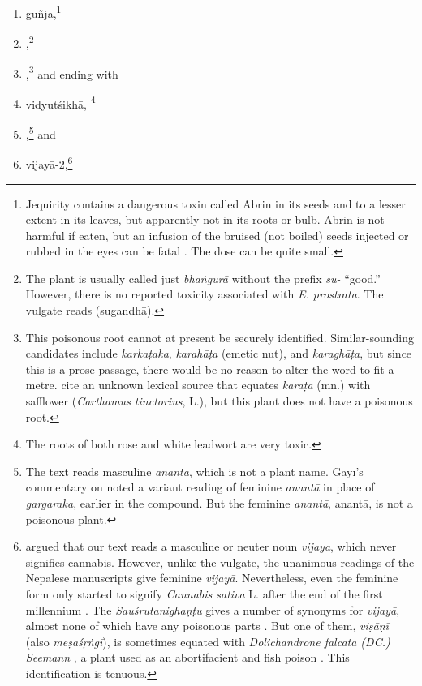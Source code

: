 \begin{translation}
\begin{itemize}
\begin{enumerate}
        \item \gls{guñjā},\footnote{Jequirity contains a dangerous
    toxin called Abrin in its seeds and to a lesser extent in its
    leaves, but apparently not in its roots or bulb. Abrin is not
    harmful if eaten, but an infusion of the bruised (not boiled)
    seeds injected or rubbed in the eyes can be fatal \citep[\#
    6]{NK}.  The dose can be quite small.}
        
        \item {},\footnote{The plant is usually
    called just \emph{bhaṅgurā} without the prefix \emph{su-}
    “good.”  However, there is no reported toxicity associated
    with \emph{E. prostrata}.  The vulgate reads 
    (\gls{sugandhā}).}
        
       \item {},\footnote{This poisonous root cannot
    at present be securely identified.  Similar-sounding
    candidates include \emph{karkaṭaka}, \emph{karahāṭa} (emetic
    nut), and \emph{karaghāṭa}, but since this is a prose passage,
    there would be no reason to alter the word to fit a metre.
    \citet[255]{moni-sans} cite an unknown lexical source that
    equates \emph{karaṭa} (mn.) with safflower (\emph{Carthamus
    tinctorius}, L.), but this plant does not have a poisonous
    root.} and ending with \item \gls{vidyutśikhā}, \footnote{The
        roots of both rose and white leadwort are very toxic.}

\item {},\footnote{The text reads masculine
    \emph{ananta}, which is not a plant name.  Gayī's commentary on
     noted a variant reading of feminine \emph{anantā} in
    place of \emph{gargaraka}, earlier in the compound. But the feminine
    \emph{anantā}, \gls{anantā}, is not a poisonous plant.} and

\item \gls{vijayā-2},\footnote{\citet[61, n.\,3]{meul-sear} argued that
    our text reads a masculine or neuter noun \emph{vijaya}, which never
    signifies cannabis. However, unlike the vulgate, the unanimous
    readings of the Nepalese manuscripts give feminine \emph{vijayā}. 
    Nevertheless, even the feminine form only started to signify
    \emph{Cannabis sativa} L. after the end of the first millennium
    \citep{meul-sear,wuja-cann,mchu-2021}. The \emph{Sauśrutanighaṇṭu}
    gives a number of synonyms for \emph{vijayā}, almost none of which
    have any poisonous parts \citep[5.77, 10.143]{suve-2000}.  But one of
    them, \emph{viṣāṇī} (also \emph{meṣaśṛṅgī}), is sometimes equated with
    \emph{Dolichandrone falcata (DC.) Seemann} \citep[518]{adps}, a plant
    used as an abortifacient and fish poison \citep[\#862]{NK}.  This
    identification is tenuous.} %
        \end{enumerate}
        \end{itemize}
    

\end{translation}
